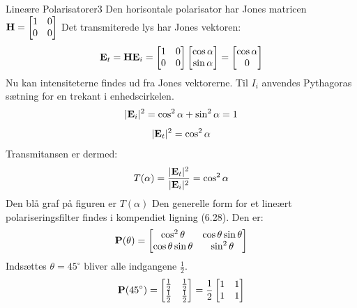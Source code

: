 \begin{opgave}{Lineære Polarisatorer}{3}
\opg Den horisontale polarisator har Jones matricen $\mathbf{H}=\begin{bmatrix}
1&0\\0&0
\end{bmatrix}$
Det transmiterede lys har Jones vektoren:
$$
\mathbf{E}_t = \mathbf{H} \mathbf{E}_i = \begin{bmatrix}
1&0\\0&0
\end{bmatrix}
\begin{bmatrix} \cos\alpha \\ \sin\alpha \end{bmatrix}
=
\begin{bmatrix} \cos\alpha \\ 0 \end{bmatrix}
$$
Nu kan intensiteterne findes ud fra Jones vektorerne. Til $I_i$ anvendes Pythagoras sætning for en trekant i enhedscirkelen.
$$
|\mathbf{E}_i|^2=\cos^2\alpha+\sin^2\alpha=1
$$
$$
|\mathbf{E}_t|^2=\cos^2\alpha
$$
Transmitansen er dermed:
$$
T(\alpha)=\frac{|\mathbf{E}_t|^2}{|\mathbf{E}_i|^2}=\cos^2\alpha
$$
\opg Den blå graf på figuren er $T(\alpha)$
\opg Den generelle form for et lineært polariseringsfilter findes i kompendiet ligning (6.28). Den er:
$$
\mathbf{P}(\theta)=\begin{bmatrix}
\cos^2\theta&\cos\theta\sin\theta\\
\cos\theta\sin\theta&\sin^2\theta
\end{bmatrix}
$$
Indsættes $\theta=45^\circ$ bliver alle indgangene $\frac{1}{2}$.
$$
\mathbf{P}(45^\circ) = \begin{bmatrix}\tfrac{1}{2}&\tfrac{1}{2}\\\tfrac{1}{2}&\tfrac{1}{2}\end{bmatrix} = \frac{1}{2} \begin{bmatrix}
1 & 1 \\
1 & 1 \\
\end{bmatrix}
$$

\end{opgave}
